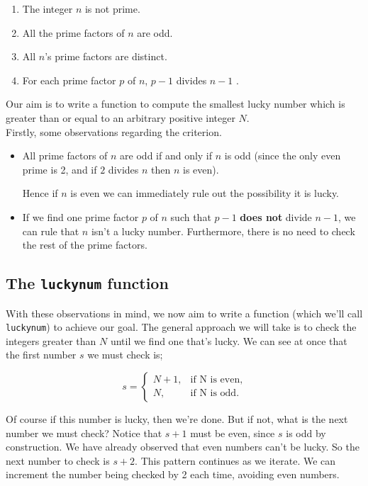 \documentclass[10pt]{article}
\begin{document}
\begin{enumerate}
\item The integer $n$ is not prime.
\item All the prime factors of $n$ are odd.
\item All $n$'s prime factors are distinct.
\item For each prime factor $p$ of $n$, $p - 1$ divides $n-1$ .
\end{enumerate}
 
\noindent Our aim is to write a function to compute the smallest lucky number which is greater than or equal to an arbitrary positive integer $N$. \\

\noindent Firstly, some observations regarding the criterion.

\begin{itemize}

\item All prime factors of $n$ are odd if and only if $n$ is odd (since the only even prime is 2, and if $2$ divides $n$ then $n$ is even).
 
 Hence if $n$ is even we can immediately rule out the possibility it is lucky.
\item If we find one prime factor $p$ of $n$ such that $p -1$ \textbf{does not} divide $n-1$, we can rule that $n$ isn't a lucky number. Furthermore, there is no need to check the rest of the prime factors.
\end{itemize}

\subsection{The \texttt{luckynum} function}

With these observations in mind, we now aim to write a function (which we'll call \texttt{luckynum}) to achieve our goal. The general approach  we will take is to check the integers greater than $N$ until we find one that's lucky. We can see at once that the first number $s$ we must check is;

$$ s = \begin{cases}
               N + 1,& \text{if N is even,}\\
               N, & \text{if N is odd.}
            \end{cases}
$$

Of course if this number is lucky, then we're done. But if not, what is the next number we must check? Notice that $s + 1$ must be even, since $s$ is odd by construction. We have already observed that even numbers can't be lucky. So the next number to check is $s+2$. This pattern continues as we iterate. We can increment the number being checked by 2 each time, avoiding even numbers.
\end{document}
